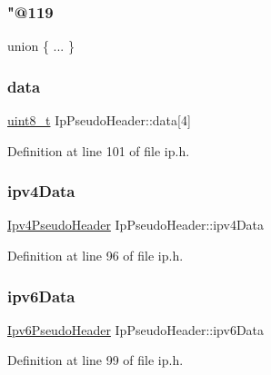 \subsubsection{\texorpdfstring{"@119}{@119}}
{\footnotesize\ttfamily union \{ ... \} }

\mbox{\label{structIpPseudoHeader_a87fecad80b6124a9af4a955525f1d39d}} 
\subsubsection{\texorpdfstring{data}{data}}
{\footnotesize\ttfamily \hyperlink{stdint_8h_aba7bc1797add20fe3efdf37ced1182c5}{uint8\+\_\+t} Ip\+Pseudo\+Header\+::data\mbox{[}4\mbox{]}}



Definition at line 101 of file ip.\+h.

\mbox{\label{structIpPseudoHeader_a4dd0d91580f30918dc7b5d5a430dba6a}} 
\subsubsection{\texorpdfstring{ipv4\+Data}{ipv4Data}}
{\footnotesize\ttfamily \hyperlink{ipv4_8h_a0e92b64e038199f1bb6383f2a76f30b6}{Ipv4\+Pseudo\+Header} Ip\+Pseudo\+Header\+::ipv4\+Data}



Definition at line 96 of file ip.\+h.

\mbox{\label{structIpPseudoHeader_a5155846ca7e85218407a8374d035aab7}} 
\subsubsection{\texorpdfstring{ipv6\+Data}{ipv6Data}}
{\footnotesize\ttfamily \hyperlink{ipv6_8h_a68061e0a0b502d880cbe60b645cfa2b7}{Ipv6\+Pseudo\+Header} Ip\+Pseudo\+Header\+::ipv6\+Data}



Definition at line 99 of file ip.\+h.

